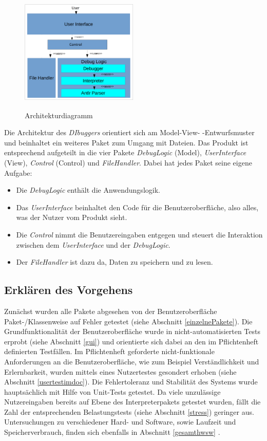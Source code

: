 \documentclass[parskip=full]{scrartcl}
\begin{document}
\begin{figure}[!h]
\centering
\includegraphics[width=0.5\textwidth]{../Plichtenheft/Architektur.png} \\
\caption{Architekturdiagramm}
\label{Architekturdiagramm}
\end{figure}
Die Architektur des \textit{DIbuggers} orientiert sich am Model-View-
-Entwurfsmuster und beinhaltet ein weiteres Paket zum Umgang mit Dateien. Das Produkt ist entsprechend aufgeteilt in die vier Pakete \textit{DebugLogic} (Model), \textit{UserInterface} (View),  \textit{Control} (Control) und \textit{FileHandler}. 
Dabei hat jedes Paket seine eigene Aufgabe:
\begin{itemize}
\item Die \textit{DebugLogic} enthält die Anwendungslogik.
\item Das \textit{UserInterface} beinhaltet den Code für die Benutzeroberfläche, also alles, was der Nutzer vom Produkt sieht.
\item Die \textit{Control} nimmt die Benutzereingaben entgegen und steuert die Interaktion zwischen dem \textit{UserInterface} und der \textit{DebugLogic}.
\item Der \textit{FileHandler} ist dazu da, Daten zu speichern und zu lesen.
\end{itemize}


\subsection{Erklären des Vorgehens}
Zunächst wurden alle Pakete abgesehen von der Benutzeroberfläche Paket-/Klassenweise auf Fehler getestet (siehe Abschnitt \ref{einzelnePakete}).
Die Grundfunktionalität der Benutzeroberfläche wurde in nicht-automatisierten Tests erprobt (siehe Abschnitt \ref{gui}) und orientierte sich dabei an den im Pflichtenheft definierten Testfällen. Im Pflichtenheft geforderte nicht-funktionale Anforderungen an die Benutzeroberfläche, wie zum Beispiel Verständlichkeit und Erlernbarkeit, wurden mittels eines Nutzertestes gesondert erhoben (siehe Abschnitt \ref{usertestimdoc}).
Die Fehlertoleranz und Stabilität des Systems wurde hauptsächlich mit Hilfe von Unit-Tests getestet. Da viele unzulässige Nutzereingaben bereits auf Ebene des Interpreterpakets getestet wurden, fällt die Zahl der entsprechenden Belastungstests (siehe Abschnitt \ref{stress}) geringer aus. Untersuchungen zu verschiedener Hard- und Software, sowie Laufzeit und Speicherverbrauch, finden sich ebenfalls in Abschnitt \ref{gesamthwsw} .
\end{document}
